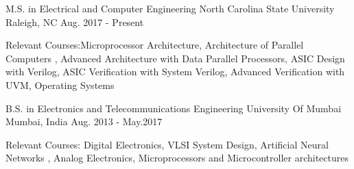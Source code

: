 

\begin{cventries}

  \cventry
    {M.S. in Electrical and Computer Engineering} %
    {North Carolina State University} %
    {Raleigh, NC} %
    {Aug. 2017 - Present} %
    {
      \begin{cvitems} %
        \item {Relevant Courses:}{Microprocessor Architecture, Architecture of Parallel Computers , Advanced Architecture with Data Parallel Processors, ASIC Design with Verilog, ASIC Verification with System Verilog, Advanced Verification with UVM, Operating Systems}
      \end{cvitems}
    }

    \cventry
    {B.S. in Electronics and Telecommunications Engineering} %
    {University Of Mumbai} %
    {Mumbai, India} %
    {Aug. 2013 - May.2017} %
    {
      \begin{cvitems} %
        \item {Relevant Courses:} {Digital Electronics, VLSI System Design, Artificial Neural Networks , Analog Electronics, Microprocessors and Microcontroller architectures}
      \end{cvitems}
    }

\end{cventries}
